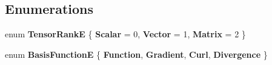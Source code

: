 \subsection*{Enumerations}
\begin{DoxyCompactItemize}
\item 
\mbox{\label{group__Basis_ga99c0a4ae66e5304b0bb7500c00f6e397}} 
enum {\bfseries Tensor\+RankE} \{ {\bfseries Scalar} = 0, 
{\bfseries Vector} = 1, 
{\bfseries Matrix} = 2
 \}
\item 
\mbox{\label{group__Basis_ga21912c7c8daa962296cd7f608150d525}} 
enum {\bfseries Basis\+FunctionE} \{ {\bfseries Function}, 
{\bfseries Gradient}, 
{\bfseries Curl}, 
{\bfseries Divergence}
 \}
\end{DoxyCompactItemize}
